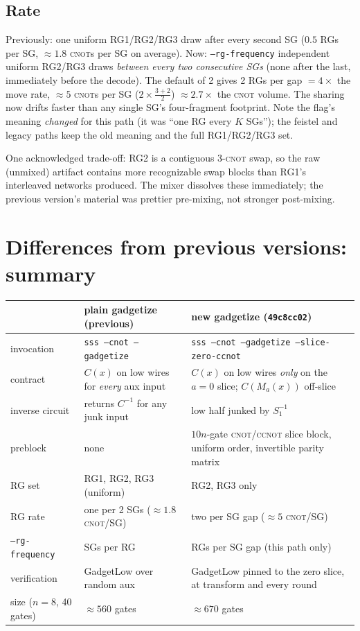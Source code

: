 \documentclass[11pt]{article}
\newcommand{\CNOT}{\textsc{cnot}}
\newcommand{\CCNOT}{\textsc{ccnot}}
\newcommand{\code}[1]{\texttt{#1}}
\newcommand{\Sone}{S_1}
\begin{document}
\subsection{Rate}

Previously: one uniform RG1/RG2/RG3 draw after every second SG
($0.5$ RGs per SG, $\approx 1.8$ \CNOT{}s per SG on average). Now:
\code{--rg-frequency} independent uniform RG2/RG3 draws \emph{between every
two consecutive SGs} (none after the last, immediately before the decode).
The default of 2 gives 2 RGs per gap $= 4\times$ the move rate,
$\approx 5$ \CNOT{}s per SG ($2 \times \frac{3+2}{2}$) $\approx 2.7\times$
the \CNOT{} volume. The sharing now drifts faster than any single SG's
four-fragment footprint. Note the flag's meaning \emph{changed} for this
path (it was ``one RG every $K$ SGs''); the feistel and legacy paths keep
the old meaning and the full RG1/RG2/RG3 set.

One acknowledged trade-off: RG2 is a contiguous 3-\CNOT{} swap, so the raw
(unmixed) artifact contains more recognizable swap blocks than RG1's
interleaved networks produced. The mixer dissolves these immediately; the
previous version's material was prettier pre-mixing, not stronger
post-mixing.

\section{Differences from previous versions: summary}

\begin{center}
\renewcommand{\arraystretch}{1.25}
\begin{tabular}{p{3.4cm}p{4.9cm}p{5.6cm}}
\toprule
 & \textbf{plain gadgetize} (previous) & \textbf{new gadgetize} (\code{49c8cc02}) \\
\midrule
invocation & \code{sss --cnot --gadgetize} & \code{sss --cnot --gadgetize --slice-zero-ccnot} \\
contract & $C(x)$ on low wires for \emph{every} aux input & $C(x)$ on low wires \emph{only} on the $a{=}0$ slice; $C(M_a(x))$ off-slice \\
inverse circuit & returns $C^{-1}$ for any junk input & low half junked by $\Sone^{-1}$ \\
preblock & none & $10n$-gate \CNOT/\CCNOT{} slice block, uniform order, invertible parity matrix \\
RG set & RG1, RG2, RG3 (uniform) & RG2, RG3 only \\
RG rate & one per 2 SGs ($\approx 1.8$ \CNOT/SG) & two per SG gap ($\approx 5$ \CNOT/SG) \\
\code{--rg-frequency} & SGs per RG & RGs per SG gap (this path only) \\
verification & GadgetLow over random aux & GadgetLow pinned to the zero slice, at transform and every round \\
size ($n{=}8$, 40 gates) & $\approx 560$ gates & $\approx 670$ gates \\
\bottomrule
\end{tabular}
\end{center}
\end{document}
